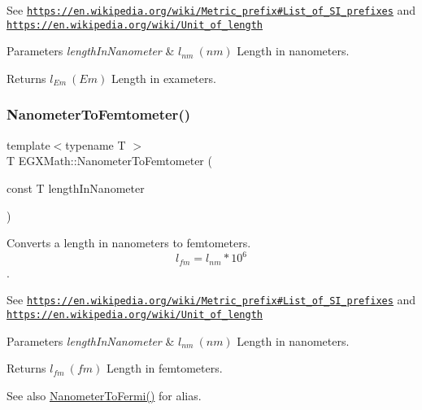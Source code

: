 See \href{https://en.wikipedia.org/wiki/Metric_prefix#List_of_SI_prefixes}{\tt https\+://en.\+wikipedia.\+org/wiki/\+Metric\+\_\+prefix\#\+List\+\_\+of\+\_\+\+S\+I\+\_\+prefixes} and \href{https://en.wikipedia.org/wiki/Unit_of_length}{\tt https\+://en.\+wikipedia.\+org/wiki/\+Unit\+\_\+of\+\_\+length} 
\begin{DoxyParams}{Parameters}
{\em length\+In\+Nanometer} & $ l_{nm}\ (nm)$ Length in nanometers. \\
\hline
\end{DoxyParams}
\begin{DoxyReturn}{Returns}
$ l_{Em}\ (Em)$ Length in exameters. 
\end{DoxyReturn}
\mbox{\label{group___e_g_x_math-_conversions-_length_conversions-_nanometer-_s_i_ga35ac002514f0d8cda8b1fe100b21f54b}} 
\subsubsection{\texorpdfstring{Nanometer\+To\+Femtometer()}{NanometerToFemtometer()}}
{\footnotesize\ttfamily template$<$typename T $>$ \\
T E\+G\+X\+Math\+::\+Nanometer\+To\+Femtometer (\begin{DoxyParamCaption}\item[{const T}]{length\+In\+Nanometer }\end{DoxyParamCaption})}



Converts a length in nanometers to femtometers. \[ l_{fm}=l_{nm} * 10^{6} \]. 

See \href{https://en.wikipedia.org/wiki/Metric_prefix#List_of_SI_prefixes}{\tt https\+://en.\+wikipedia.\+org/wiki/\+Metric\+\_\+prefix\#\+List\+\_\+of\+\_\+\+S\+I\+\_\+prefixes} and \href{https://en.wikipedia.org/wiki/Unit_of_length}{\tt https\+://en.\+wikipedia.\+org/wiki/\+Unit\+\_\+of\+\_\+length} 
\begin{DoxyParams}{Parameters}
{\em length\+In\+Nanometer} & $ l_{nm}\ (nm)$ Length in nanometers. \\
\hline
\end{DoxyParams}
\begin{DoxyReturn}{Returns}
$ l_{fm}\ (fm)$ Length in femtometers. 
\end{DoxyReturn}
\begin{DoxySeeAlso}{See also}
\mbox{\hyperlink{group___e_g_x_math-_conversions-_length_conversions-_nanometer-_non-_s_i_ga9b708f83b519464f5ebb912bcaaf747d}{Nanometer\+To\+Fermi()}} for alias. 
\end{DoxySeeAlso}
\mbox{\label{group___e_g_x_math-_conversions-_length_conversions-_nanometer-_s_i_ga235d244736444af6437d9086ae1f485d}} 
